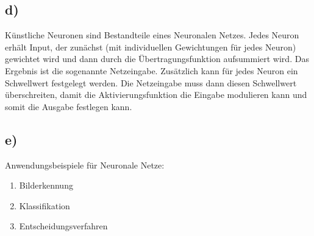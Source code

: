 \documentclass[a4paper, 11pt]{article}
\begin{document}
\subsection*{d)}
Künstliche Neuronen sind Bestandteile eines Neuronalen Netzes. Jedes Neuron erhält
Input, der zunächst (mit individuellen Gewichtungen für jedes Neuron) gewichtet
wird und dann durch die Übertragungsfunktion aufsummiert wird. Das Ergebnis ist
die sogenannte Netzeingabe. Zusätzlich kann für jedes Neuron ein Schwellwert
festgelegt werden. Die Netzeingabe muss dann diesen Schwellwert überschreiten,
damit die Aktivierungsfunktion die Eingabe modulieren kann und somit die Ausgabe
festlegen kann.

\subsection*{e)}
Anwendungsbeispiele für Neuronale Netze:
\begin{enumerate}
  \item Bilderkennung
  \item Klassifikation
  \item Entscheidungsverfahren
\end{enumerate}
\end{document}
